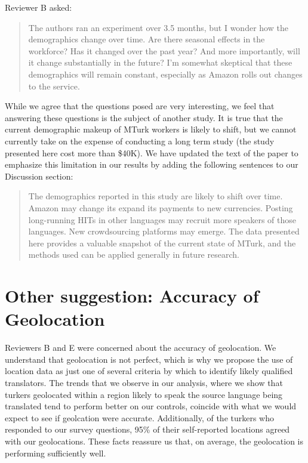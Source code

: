 \documentclass[11pt]{article}
\begin{document}
 Reviewer B asked: 
\begin{quote}
The authors ran an experiment over 3.5 months, but I wonder how the demographics change over time. Are there seasonal effects in the workforce? Has it changed over the past year? And more importantly, will it change substantially in the future? I'm somewhat skeptical that these demographics will remain constant, especially as Amazon rolls out changes to the service.
\end{quote}

While we agree that the questions posed are very interesting, we feel that answering these questions is the subject of another study. It is true that the current demographic makeup of MTurk workers is likely to shift, but we cannot currently take on the expense of conducting a long term study (the study presented here cost more than \$40K). We have updated the text of the paper to emphasize this limitation in our results by adding the following sentences to our Discussion section: 
\begin{quote}
The demographics reported in this study are likely to shift over time. Amazon may change its expand its payments to new currencies.  Posting long-running HITs in other languages may recruit more speakers of those languages.  New crowdsourcing platforms may emerge. The data presented here provides a valuable snapshot of the current state of MTurk, and the methods used can be applied generally in future research.
\end{quote}

\section{Other suggestion: Accuracy of Geolocation}

Reviewers B and E were concerned about the accuracy of geolocation. 
We understand that geolocation is not perfect, which is why we propose the use of location data as just one of several criteria by which to identify likely qualified translators. The trends that we observe in our analysis, where we show that turkers geolocated within a region likely to speak the source language being translated tend to perform better on our controls, coincide with what we would expect to see if geolcation were accurate. Additionally, of the turkers who responded to our survey questions, 95\% of their self-reported locations agreed with our geolocations. These facts reassure us that, on average, the geolocation is performing sufficiently well.
\end{document}
